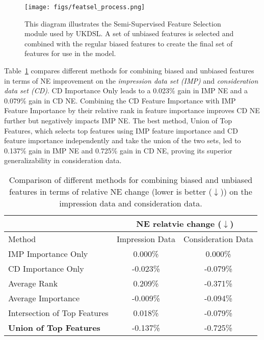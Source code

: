 \begin{figure}[t]
\centering
\hspace*{0.5cm} 
\texttt{[image: figs/featsel\_process.png]}
\caption{This diagram illustrates the Semi-Supervised Feature Selection module used by UKDSL. A set of unbiased features is selected and combined with the regular biased features to create the final set of features for use in the model.}
\label{fig:cdfaf}
\end{figure}




Table~\ref{tb:cdfaf} compares different methods for combining biased and unbiased features in terms of NE improvement on the \emph{impression data set (IMP)} and \emph{consideration data set (CD)}. 
CD Importance Only leads to a 0.023\% gain in IMP NE and a 0.079\% gain in CD NE. Combining the CD Feature Importance with IMP Feature Importance by their relative rank in feature importance improves CD NE further but negatively impacts IMP NE. The best method, Union of Top Features, which selects top features using IMP feature importance and CD feature importance independently and take the union of the two sets, led to 0.137\% gain in IMP NE and 0.725\% gain in CD NE, proving its superior generalizability in consideration data.

\begin{table}[t]
\caption{Comparison of different methods for combining biased and unbiased features in terms of relative NE change (lower is better ($\downarrow$)) on the impression data and consideration data.}
\label{tb:cdfaf}
\centering
\begin{tabular}{lcc}
\toprule
& \multicolumn{2}{c}{NE relatvie change  ($\downarrow$)} \\
\midrule
Method & Impression Data& Consideration Data\\
\midrule
IMP Importance Only & 0.000\% & 0.000\% \\
\hline
CD Importance Only & -0.023\%& -0.079\%\\
\hline
Average Rank & 0.209\%& -0.371\%\\
\hline
Average Importance & -0.009\%& -0.094\%\\
\hline
Intersection of Top Features & 0.018\%& -0.079\%\\
\hline
\textbf{Union of Top Features} & -0.137\%& -0.725\%\\
\bottomrule
\end{tabular}
\end{table}
